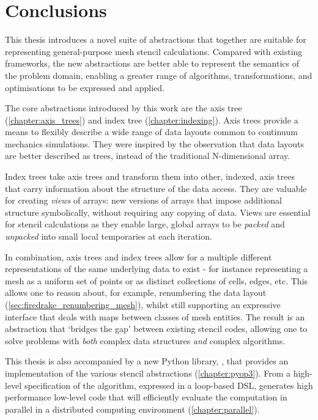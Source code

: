 \documentclass[thesis]{subfiles}
\begin{document}
\chapter{Conclusions}
\label{chapter:conclusions}

This thesis introduces a novel suite of abstractions that together are suitable for representing general-purpose mesh stencil calculations.
Compared with existing frameworks, the new abstractions are better able to represent the semantics of the problem domain, enabling a greater range of algorithms, transformations, and optimisations to be expressed and applied.

The core abstractions introduced by this work are the axis tree (\cref{chapter:axis_trees}) and index tree (\cref{chapter:indexing}).
Axis trees provide a means to flexibly describe a wide range of data layouts common to continuum mechanics simulations.
They were inspired by the observation that data layouts are better described as trees, instead of the traditional N-dimensional array.

Index trees take axis trees and transform them into other, indexed, axis trees that carry information about the structure of the data access.
They are valuable for creating \emph{views} of arrays: new versions of arrays that impose additional structure symbolically, without requiring any copying of data.
Views are essential for stencil calculations as they enable large, global arrays to be \emph{packed} and \emph{unpacked} into small local temporaries at each iteration.

In combination, axis trees and index trees allow for a multiple different representations of the same underlying data to exist - for instance representing a mesh as a uniform set of points or as distinct collections of cells, edges, etc.
This allows one to reason about, for example, renumbering the data layout (\cref{sec:firedrake_renumbering_mesh}), whilst still supporting an expressive interface that deals with maps between classes of mesh entities.
The result is an abstraction that `bridges the gap' between existing stencil codes, allowing one to solve problems with \emph{both} complex data structures \emph{and} complex algorithms.

This thesis is also accompanied by a new Python library, , that provides an implementation of the various stencil abstractions (\cref{chapter:pyop3}).
From a high-level specification of the algorithm, expressed in a loop-based DSL,  generates high performance low-level code that will efficiently evaluate the computation in parallel in a distributed computing environment (\cref{chapter:parallel}).
\end{document}
